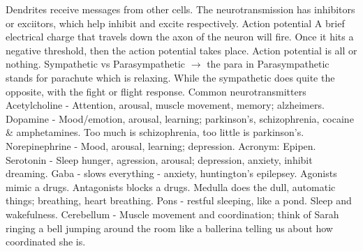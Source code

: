 \markdownRendererUlItem Dendrites receive messages from other cells.\markdownRendererUlItemEnd 
\markdownRendererUlItem The neurotransmission has inhibitors or exciitors, which help inhibit and excite respectively.\markdownRendererUlItemEnd 
\markdownRendererUlItem Action potential\markdownRendererInterblockSeparator
{}\markdownRendererUlBeginTight
\markdownRendererUlItem A brief electrical charge that travels down the axon of the neuron will fire.\markdownRendererUlItemEnd 
\markdownRendererUlItem Once it hits a negative threshold, then the action potential takes place.\markdownRendererUlItemEnd 
\markdownRendererUlItem Action potential is all or nothing.\markdownRendererUlItemEnd 
\markdownRendererUlEndTight \markdownRendererUlItemEnd 
\markdownRendererUlEndTight \markdownRendererInterblockSeparator
{}\markdownRendererInterblockSeparator
{}\markdownRendererUlBegin
\markdownRendererUlItem Sympathetic vs Parasympathetic $\rightarrow$ the para in Parasympathetic stands for parachute which is relaxing. While the sympathetic does quite the opposite, with the fight or flight response.\markdownRendererUlItemEnd 
\markdownRendererUlItem Common neurotransmitters\markdownRendererInterblockSeparator
{}\markdownRendererUlBeginTight
\markdownRendererUlItem Acetylcholine - Attention, arousal, muscle movement, memory; alzheimers.\markdownRendererUlItemEnd 
\markdownRendererUlItem Dopamine - Mood/emotion, arousal, learning; parkinson's, schizophrenia, cocaine & amphetamines. Too much is schizophrenia, too little is parkinson's.\markdownRendererUlItemEnd 
\markdownRendererUlItem Norepinephrine - Mood, arousal, learning; depression. Acronym: Epipen.\markdownRendererUlItemEnd 
\markdownRendererUlItem Serotonin - Sleep hunger, agression, arousal; depression, anxiety, inhibit dreaming.\markdownRendererUlItemEnd 
\markdownRendererUlItem Gaba - slows everything - anxiety, huntington's epilepsey.\markdownRendererUlItemEnd 
\markdownRendererUlEndTight \markdownRendererUlItemEnd 
\markdownRendererUlItem Agonists mimic a drugs.\markdownRendererUlItemEnd 
\markdownRendererUlItem Antagonists blocks a drugs.\markdownRendererUlItemEnd 
\markdownRendererUlEnd \markdownRendererInterblockSeparator
{}\markdownRendererInterblockSeparator
{}\markdownRendererUlBeginTight
\markdownRendererUlItem Medulla does the dull, automatic things; breathing, heart breathing.\markdownRendererUlItemEnd 
\markdownRendererUlItem Pons - restful sleeping, like a pond. Sleep and wakefulness.\markdownRendererUlItemEnd 
\markdownRendererUlItem Cerebellum - Muscle movement and coordination; think of Sarah ringing a bell jumping around the room like a ballerina telling us about how coordinated she is.\markdownRendererUlItemEnd 
